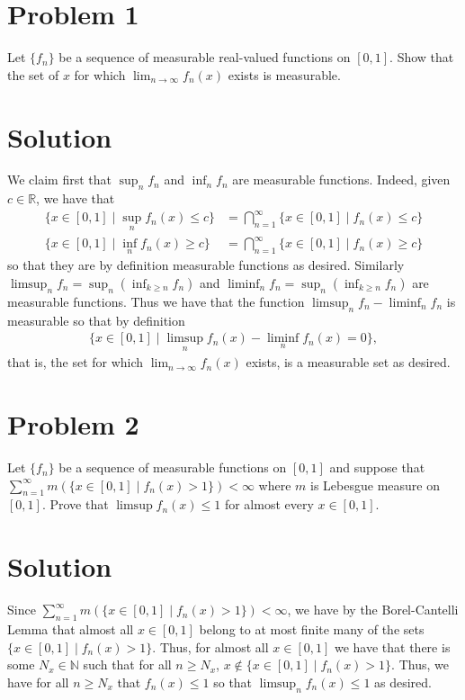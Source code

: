\documentclass{article}
\begin{document}
\section*{Problem 1}
Let $\{f_n\}$ be a sequence of measurable real-valued functions on $[0,1]$.  Show that the set of $x$ for which $\lim_{n\rightarrow\infty}f_n(x)$ exists is measurable.

\section*{Solution}
We claim first that $\sup_nf_n$ and $\inf_nf_n$ are measurable functions.  Indeed, given $c\in\mathbb{R}$, we have that
\begin{align*}
\{x\in[0,1]\mid\sup_nf_n(x)\leq c\}&=\bigcap_{n=1}^\infty\{x\in[0,1]\mid f_n(x)\leq c\}\\
\{x\in[0,1]\mid\inf_nf_n(x)\geq c\}&=\bigcap_{n=1}^\infty\{x\in[0,1]\mid f_n(x)\geq c\}
\end{align*}
so that they are by definition measurable functions as desired.  Similarly $\limsup_nf_n=\sup_{n}(\inf_{k\geq n}f_n)$ and $\liminf_nf_n=\sup_n(\inf_{k\geq n}f_n)$ are measurable functions.  Thus we have that the function $\limsup_nf_n-\liminf_nf_n$ is measurable so that by definition
\begin{align*}
\{x\in[0,1]\mid \limsup_nf_n(x)-\liminf_nf_n(x)=0\},
\end{align*}
that is, the set for which $\lim_{n\rightarrow\infty}f_n(x)$ exists, is a measurable set as desired.\\

\section*{Problem 2}
Let $\{f_n\}$ be a sequence of measurable functions on $[0,1]$ and suppose that $\sum_{n=1}^\infty m(\{x\in[0,1]\mid f_n(x)>1\})<\infty$ where $m$ is Lebesgue measure on $[0,1]$.  Prove that $\limsup f_n(x)\leq 1$ for almost every $x\in[0,1]$.

\section*{Solution}
Since $\sum_{n=1}^\infty m(\{x\in[0,1]\mid f_n(x)>1\})<\infty$, we have by the Borel-Cantelli Lemma that almost all $x\in[0,1]$ belong to at most finite many of the sets $\{x\in[0,1]\mid f_n(x)>1\}$.  Thus, for almost all $x\in[0,1]$ we have that there is some $N_x\in\mathbb{N}$ such that for all $n\geq N_x$, $x\not\in\{x\in[0,1]\mid f_n(x)>1\}$.  Thus, we have for all $n\geq N_x$ that $f_n(x)\leq 1$ so that $\limsup_nf_n(x)\leq 1$ as desired.
\end{document}
